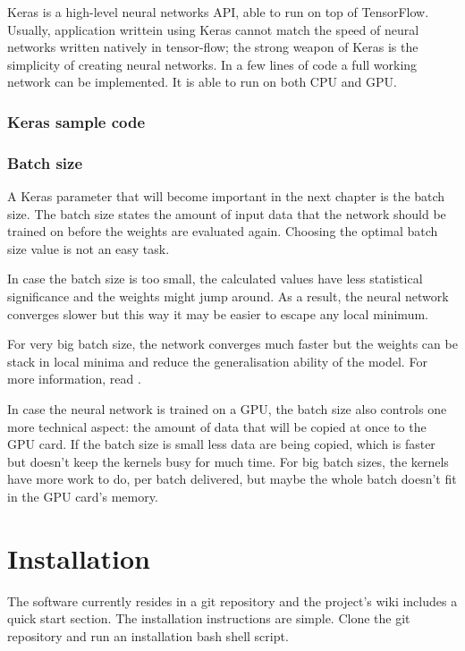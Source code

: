 Keras \cite{keras} is a high-level neural networks API, able to run on top of TensorFlow. Usually, application writtein using Keras cannot match the speed of neural networks written natively in tensor-flow; the strong weapon of Keras is the simplicity of creating neural networks. In a few lines of code a full working network can be implemented. It is able to run on both CPU and GPU.

\subsubsection{Keras sample code}


\subsubsection{Batch size}
A Keras parameter that will become important in the next chapter is the batch size. The batch size states the amount of input data that the network should be trained on before the weights are evaluated again. Choosing the optimal batch size value is not an easy task.

In case the batch size is too small, the calculated values have less statistical significance and the weights might jump around. As a result, the neural network converges slower but this way it may be easier to escape any local minimum.

For very big batch size, the network converges much faster but the weights can be stack in local minima and reduce the generalisation ability of the model. For more information, read \cite{keskar2016large}.

In case the neural network is trained on a GPU, the batch size also controls one more technical aspect: the amount of data that will be copied at once to the GPU card. If the batch size is small less data are being copied, which is faster but doesn't keep the kernels busy for much time. For big batch sizes, the kernels have more work to do, per batch delivered, but maybe the whole batch doesn't fit in the GPU card's memory.  


\section{Installation}\label{nninstall}
        The software currently resides in a git repository\cite{anngit} and the project's wiki includes a quick start section. The installation instructions are simple. Clone the git repository and run an installation bash shell script.
        
